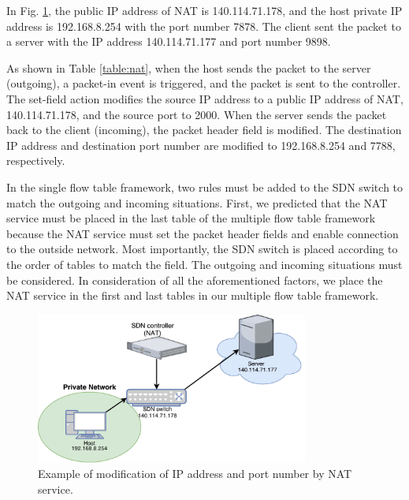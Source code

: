In Fig. \ref{fig:mft_nat}, the public IP address of NAT is 140.114.71.178, and the host private IP address is 192.168.8.254 with the port number 7878. The client sent the packet to a server with the IP address 140.114.71.177 and port number 9898.

As shown in Table \ref{table:nat}, when the host sends the packet to the server (outgoing), a packet-in event is triggered, and the packet is sent to the controller. The set-field action modifies the source IP address to a public IP address of NAT, 140.114.71.178, and the source port to 2000. When the server sends the packet back to the client (incoming), the packet header field is modified. The destination IP address and destination port number are modified to 192.168.8.254 and 7788, respectively.

In the single flow table framework, two rules must be added to the SDN switch to match the outgoing and incoming situations. First, we predicted that the NAT service must be placed in the last table of the multiple flow table framework because the NAT service must set the packet header fields and enable connection to the outside network. Most importantly, the SDN switch is placed according to the order of tables to match the field. The outgoing and incoming situations must be considered. In consideration of all the aforementioned factors, we place the NAT service in the first and last tables in our multiple flow table framework.

\begin{figure}[!t]
\centering
\includegraphics[width=0.8\textwidth]{./fig/mft_nat.pdf}
\caption{Example of modification of IP address and port number by NAT service.}
\label{fig:mft_nat}
\end{figure}

